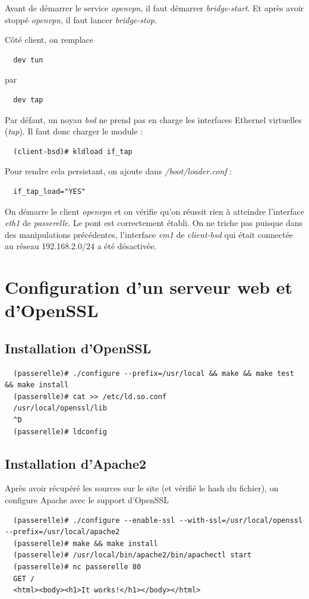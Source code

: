 \documentclass[a4paper]{article}
\begin{document}
Avant de démarrer le service \textit{openvpn}, il faut démarrer \textit{bridge-start}.
Et après avoir stoppé \textit{openvpn}, il faut lancer \textit{bridge-stop}.

Côté client, on remplace
\begin{verbatim}
  dev tun
\end{verbatim}
par
\begin{verbatim}
  dev tap
\end{verbatim}

Par défaut, un noyau \textit{bsd} ne prend pas en charge les interfaces Ethernel virtuelles (\textit{tap}).
Il faut donc charger le module :
\begin{verbatim}
  (client-bsd)# kldload if_tap
\end{verbatim}

Pour rendre cela persistant, on ajoute dans \textit{/boot/loader.conf} :
\begin{verbatim}
  if_tap_load="YES"
\end{verbatim}

On démarre le client \textit{openvpn} et on vérifie qu'on réussit rien à atteindre
l'interface \textit{eth1} de \textit{passerelle}. Le pont est correctement établi.
On ne triche pas puisque dans des manipulations précédentes, l'interface \textit{em1}
de \textit{client-bsd} qui était connectée au réseau 192.168.2.0/24 a été désactivée.

\section{Configuration d'un serveur web et d'OpenSSL}
\subsection{Installation d'OpenSSL}
\begin{verbatim}
  (passerelle)# ./configure --prefix=/usr/local && make && make test && make install
  (passerelle)# cat >> /etc/ld.so.conf
  /usr/local/openssl/lib
  ^D
  (passerelle)# ldconfig
\end{verbatim}

\subsection{Installation d'Apache2}
Après avoir récupéré les sources sur le site (et vérifié le hash du fichier), on configure
Apache avec le support d'OpenSSL
\begin{verbatim}
  (passerelle)# ./configure --enable-ssl --with-ssl=/usr/local/openssl --prefix=/usr/local/apache2
  (passerelle)# make && make install
  (passerelle)# /usr/local/bin/apache2/bin/apachectl start
  (passerelle)# nc passerelle 80
  GET /
  <html><body><h1>It works!</h1></body></html>
\end{verbatim}
\end{document}
